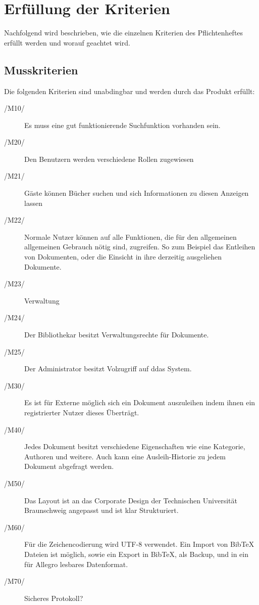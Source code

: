 \chapter{Erfüllung der Kriterien}

Nachfolgend wird beschrieben, wie die einzelnen Kriterien des Pflichtenheftes
erfüllt werden und worauf geachtet wird.
\section{Musskriterien}

Die folgenden Kriterien sind unabdingbar und werden durch das Produkt erfüllt:
\begin{description}
  \item[/M10/] Es muss eine gut funktionierende Suchfunktion vorhanden sein.
  \item[/M20/] Den Benutzern werden verschiedene Rollen zugewiesen
  \item[/M21/] Gäste können Bücher suchen und sich Informationen zu diesen Anzeigen
			   lassen
  \item[/M22/] Normale Nutzer können auf alle Funktionen, die für den allgemeinen
			   allgemeinen Gebrauch nötig sind, zugreifen. So zum Beispiel das Entleihen von
			   Dokumenten, oder die Einsicht in ihre derzeitig ausgeliehen Dokumente.
  \item[/M23/] Verwaltung
  \item[/M24/] Der Bibliothekar besitzt Verwaltungsrechte für Dokumente.
  \item[/M25/] Der Administrator besitzt Volzugriff auf ddas System.
  \item[/M30/] Es ist für Externe möglich sich ein Dokument auszuleihen indem ihnen
ein registrierter Nutzer dieses Überträgt.
  \item[/M40/] Jedes Dokument besitzt verschiedene Eigenschaften wie eine Kategorie,
Authoren und weitere. Auch kann eine Ausleih-Historie zu jedem Dokument
abgefragt werden.
  \item[/M50/] Das Layout ist an das Corporate Design der Technischen Universität
Braunschweig angepasst und ist klar Strukturiert.
  \item[/M60/] Für die Zeichencodierung wird UTF-8 verwendet.
Ein Import von BibTeX Dateien ist möglich, sowie ein Export in BibTeX, als
Backup, und in ein für Allegro lesbares Datenformat.
  \item[/M70/] Sicheres Protokoll?
\end {description}

